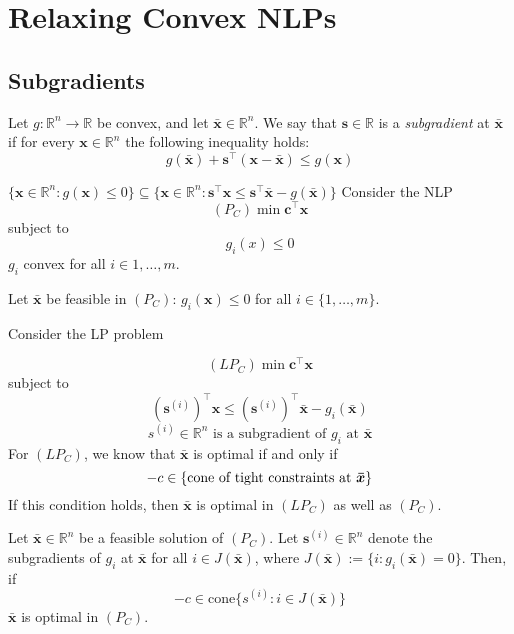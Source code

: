 \section{Relaxing Convex NLPs}
\subsection{Subgradients}
\begin{defbox}
    \begin{definition}
        Let $ g:\mathbb{R}^n\to\mathbb{R} $ be convex, and let $ \bm{\bar{x}}\in\mathbb{R}^n $.
        We say that $ \bm{s}\in\mathbb{R} $ is a \emph{subgradient} at $ \bm{\bar{x}} $
        if for every $ \bm{x}\in\mathbb{R}^n $ the following inequality holds:
        \[ g(\bm{\bar{x}})+\bm{s}^\top(\bm{x}-\bm{\bar{x}})\leqslant g(\bm{x}) \]
    \end{definition}
\end{defbox}
$ \{\bm{x}\in\mathbb{R}^n:g(\bm{x})\leqslant 0\}\subseteq
\{\bm{x}\in\mathbb{R}^n:\bm{s}^\top\bm{x}\leqslant \bm{s}^\top \bm{\bar{x}}-g(\bm{\bar{x}})\}$
Consider the NLP
\[ (P_C)\min \bm{c}^\top\bm{x} \]
subject to
\[ g_i(x)\leqslant 0 \]
$ g_i $ convex for all $ i\in{1,\ldots ,m} $.

Let $ \bm{\bar{x}} $ be feasible in $ (P_C) $: $ g_i(\bm{x})\leqslant 0 $
for all $ i\in \{1,\ldots ,m\} $.

Consider the LP problem

\[ (LP_C)\min \bm{c}^\top\bm{x} \]
subject to
\[ (\bm{s}^{(i)})^\top \bm{x}\leqslant  (\bm{s}^{(i)})^\top \bm{\bar{x}}-g_i(\bm{\bar{x}}) \]
\[ s^{(i)}\in\mathbb{R}^n \text{ is a subgradient of $g_i$ at $\bm{\bar{x}}$} \]
For $ (LP_C) $, we know that $ \bm{\bar{x}} $ is optimal if and only if
\[ -c\in \{\text{cone of tight constraints at $ \bm{\bar{x}} $}\} \]
If this condition holds, then $ \bm{\bar{x}} $ is optimal in $ (LP_C) $ as
well as $ (P_C) $.

\begin{thmbox}
    \begin{theorem}
        Let $ \bm{\bar{x}}\in \mathbb{R}^n $ be a feasible solution of $ (P_C) $.
        Let $ \bm{s}^{(i)}\in\mathbb{R}^n $ denote the subgradients of $ g_i $
        at $ \bm{\bar{x}} $ for all $ i\in J(\bm{\bar{x}}) $, where
        $ J(\bm{\bar{x}}):=\{i:g_i(\bm{\bar{x}})=0\} $. Then, if
        \[ -c\in\text{cone} \{s^{(i)}:i\in J(\bm{\bar{x}})\} \]
        $ \bm{\bar{x}} $ is optimal in $ (P_C) $.
    \end{theorem}
\end{thmbox}

